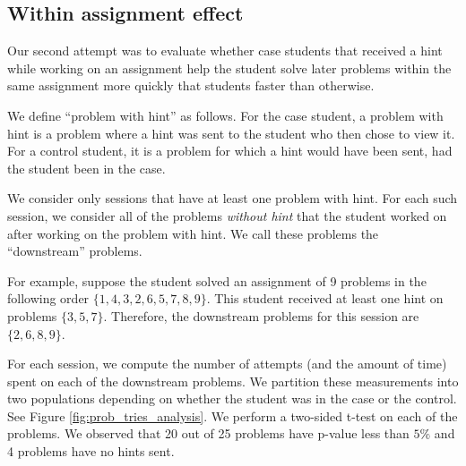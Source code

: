 \documentclass{llncs2e/llncs}
\begin{document}
\subsection{Within assignment effect}

Our second attempt was to evaluate whether case students that received a hint while working on an assignment help the student solve later problems within the same assignment more quickly that students faster than otherwise.

We define ``problem with hint'' as follows. For the case student, a problem with hint is a problem where a hint was sent to the student who then chose to view it. For a control student, it is a problem for which a hint would have been sent, had the student been in the case.

We consider only sessions that have at least one problem with hint. For each such session, we consider all of the problems {\em without hint} that the student worked on after working on the problem with hint. We call these problems the ``downstream'' problems.

For example, suppose the student solved an assignment of 9 problems in the following order $\{ 1, 4, 3, 2, 6, 5, 7, 8, 9\}$. This student received at least one hint on problems $\{3, 5, 7\}$. Therefore, the downstream problems for this session are $\{2, 6, 8, 9\}$.

For each session, we compute the number of attempts (and the amount of time) spent on each of the downstream problems. We partition these measurements into two populations depending on whether the student was in the case or the control. See Figure \ref{fig:prob_tries_analysis}. We perform a two-sided t-test on each of the problems. We observed that 20 out of 25 problems have p-value less than $5\%$ and 4 problems have no hints sent.
\end{document}
